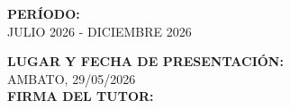 \begin{titlepage}
\begin{center}
    \textbf{\large PERÍODO:} \\
    JULIO 2026 - DICIEMBRE 2026\\
    \vspace{0.5cm}
    
    \textbf{\large LUGAR Y FECHA DE PRESENTACIÓN:} \\
    AMBATO, 29/05/2026 \\
    \vspace{0.5cm}
    \textbf{\large FIRMA DEL TUTOR:} \\[.8cm]
    \vspace{1cm}
    \makebox[8cm]{\hrulefill} \\
\end{center}    
    \vspace{2cm}
\end{titlepage}